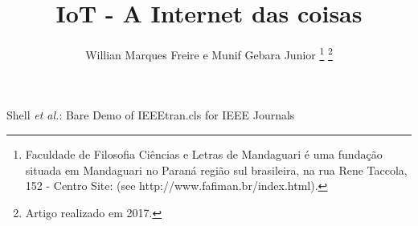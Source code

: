 \documentclass[journal]{IEEEtran}
\begin{document}
%
\title{IoT - A Internet das coisas}
%
%
%

\author{Willian Marques Freire e
        Munif Gebara Junior%
\thanks{Faculdade de Filosofia Ciências e Letras de Mandaguari é uma fundação
situada em Mandaguari no Paraná região sul brasileira,
na rua Rene Taccola, 152 - Centro Site: (see http://www.fafiman.br/index.html).}%
\thanks{Artigo realizado em 2017.}}

% 
%



%
{Shell \MakeLowercase{\textit{et al.}}: Bare Demo of IEEEtran.cls for IEEE Journals}
% 
\end{document}

